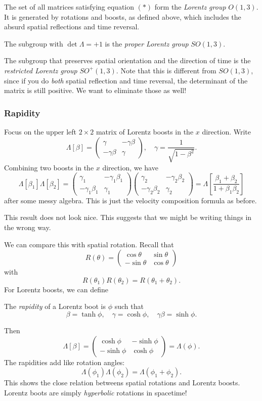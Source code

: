 \documentclass[a4paper]{article}
\begin{document}
The set of all matrices satisfying equation $(*)$ form the \emph{Lorentz group} $O(1, 3)$. It is generated by rotations and boosts, as defined above, which includes the absurd spatial reflections and time reversal.

The subgroup with $\det \Lambda = +1$ is the \emph{proper Lorentz group} $SO(1, 3)$.

The subgroup that preserves spatial orientation and the direction of time is the \emph{restricted Lorentz group} $SO^+(1, 3)$. Note that this is different from $SO(1, 3)$, since if you do \emph{both} spatial reflection and time reversal, the determinant of the matrix is still positive. We want to eliminate those as well!

\subsubsection*{Rapidity}
Focus on the upper left $2\times 2$ matrix of Lorentz boosts in the $x$ direction. Write
\[
  \Lambda[\beta] =
  \begin{pmatrix}
    \gamma & -\gamma\beta\\
    -\gamma\beta & \gamma
  \end{pmatrix}
  ,\quad
  \gamma = \frac{1}{\sqrt{1 - \beta^2}}.
\]
Combining two boosts in the $x$ direction, we have
\[
  \Lambda[\beta_1]\Lambda[\beta_2] =
  \begin{pmatrix}
    \gamma_1 & -\gamma_1\beta_1\\
    -\gamma_1\beta_1 & \gamma_1
  \end{pmatrix}
  \begin{pmatrix}
    \gamma_2 & -\gamma_2\beta_2\\
    -\gamma_2\beta_2 & \gamma_2
  \end{pmatrix}
  = \Lambda\left[\frac{\beta_1 + \beta_2}{1 + \beta_1\beta_2}\right]
\]
after some messy algebra. This is just the velocity composition formula as before.

This result does not look nice. This suggests that we might be writing things in the wrong way.

We can compare this with spatial rotation. Recall that
\[
  R(\theta) =
  \begin{pmatrix}
    \cos \theta & \sin \theta\\
    -\sin \theta & \cos \theta
  \end{pmatrix}
\]
with
\[
  R(\theta_1)R(\theta_2) = R(\theta_1 + \theta_2).
\]
For Lorentz boosts, we can define
\begin{defi}[Rapidity]
  The \emph{rapidity} of a Lorentz boot is $\phi$ such that
  \[
    \beta = \tanh \phi,\quad \gamma = \cosh\phi,\quad \gamma\beta=\sinh \phi.
  \]
\end{defi}
Then
\[
  \Lambda[\beta] =
  \begin{pmatrix}
    \cosh \phi & -\sinh \phi\\
    -\sinh \phi & \cosh \phi
  \end{pmatrix}
  = \Lambda(\phi).
\]
The rapidities add like rotation angles:
\[
  \Lambda(\phi_1)\Lambda(\phi_2) = \Lambda(\phi_1 + \phi_2).
\]
This shows the close relation betweens spatial rotations and Lorentz boosts. Lorentz boots are simply \emph{hyperbolic} rotations in spacetime!
\end{document}

